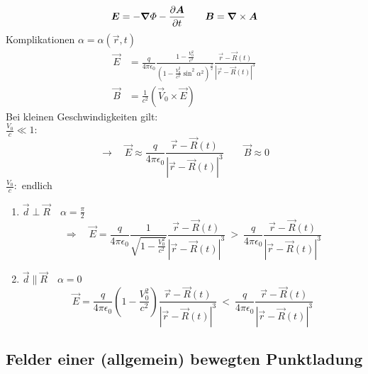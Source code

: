 \begin{equation*}
\bm{E} = - \bm{\nabla} \varPhi - \frac{\partial \bm{A}}{\partial t} \qquad \bm{B} = \bm{\nabla} \times \bm{A}
\end{equation*}
Komplikationen $ \alpha = \alpha(\vec{r},t) $
%
%
%
%
%
%
\begin{align*}
\vec{E} &= \frac{q}{4 \pi \epsilon_0} \frac{1 - \frac{V_0^2}{c^2}}{\left(1 - \frac{V_0^2}{c^2} \sin^2 \alpha^2\right)^{\frac{3}{2}}} \frac{\vec{r} - \vec{R}(t)}{|\vec{r} - \vec{R}(t)|^3}\\
\vec{B} &= \frac{1}{c^2} \left(\vec{V}_0 \times \vec{E}\right)
\end{align*}
Bei kleinen Geschwindigkeiten gilt:\\
$ \frac{V_0}{c} \ll 1 : $
\begin{equation*}
\rightarrow \quad \vec{E} \approx \frac{q}{4 \pi \epsilon_0} \frac{\vec{r} - \vec{R}(t)}{|\vec{r} - \vec{R}(t)|^3} \qquad \vec{B} \approx 0
\end{equation*}
$ \frac{V_0}{c} : $ endlich
%
%
%
%
%
%
\begin{enumerate}[1)]
	\item $ \vec{d} \perp \vec{R} \quad \alpha = \frac{\pi}{2} $
	\begin{equation*}
	\Rightarrow \quad \vec{E} = \frac{q}{4 \pi \epsilon_0} \frac{1}{\sqrt{1 - \frac{V_0^2}{c^2}}} \frac{\vec{r} - \vec{R}(t)}{|\vec{r} - \vec{R}(t)|^3} \ > \ \frac{q}{4 \pi \epsilon_0} \frac{\vec{r} - \vec{R}(t)}{|\vec{r} - \vec{R}(t)|^3}
	\end{equation*}
	\item $ \vec{d} \parallel \vec{R} \quad \alpha = 0 $
	\begin{equation*}
	\vec{E} = \frac{q}{4 \pi \epsilon_0} \left(1 - \frac{V_0^2}{c^2}\right) \frac{\vec{r} - \vec{R}(t)}{|\vec{r} - \vec{R}(t)|^3} \ < \ \frac{q}{4 \pi \epsilon_0} \frac{\vec{r} - \vec{R}(t)}{|\vec{r} - \vec{R}(t)|^3}
	\end{equation*}
\end{enumerate}

\subsection{Felder einer (allgemein) bewegten Punktladung}

